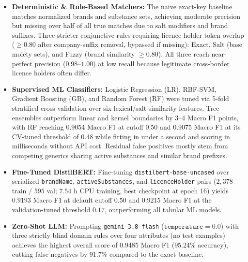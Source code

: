 \documentclass{llncs}
\begin{document}
\begin{itemize}
  \item \textbf{Deterministic \& Rule-Based Matchers:} The naive exact-key baseline matches normalized brands and substance sets, achieving moderate precision but missing over half of all true matches due to salt modifiers and brand suffixes. Three stricter conjunctive rules requiring licence-holder token overlap ($\ge 0.80$ after company-suffix removal, bypassed if missing): Exact, Salt (base moiety sets), and Fuzzy (brand similarity $\ge 0.80$). All three reach near-perfect precision ($0.98$--$1.00$) at low recall because legitimate cross-border licence holders often differ.
  \item \textbf{Supervised ML Classifiers:} Logistic Regression (LR), RBF-SVM, Gradient Boosting (GB), and Random Forest (RF) were tuned via 5-fold stratified cross-validation over six lexical/salt similarity features. Tree ensembles outperform linear and kernel boundaries by 3--4 Macro F1 points, with RF reaching 0.9054 Macro F1 at cutoff 0.50 and 0.9075 Macro F1 at its CV-tuned threshold of 0.48 while fitting in under a second and scoring in milliseconds without API cost. Residual false positives mostly stem from competing generics sharing active substances and similar brand prefixes.
  \item \textbf{Fine-Tuned DistilBERT:} Fine-tuning \texttt{distilbert-base-uncased} over serialized \texttt{brandName}, \texttt{activeSubstances}, and \texttt{licenceHolder} pairs ($2{,}378$ train / $595$ val; $7.54\text{ h}$ CPU training, best checkpoint at epoch 16) yields $0.9193$ Macro F1 at default cutoff $0.50$ and 0.9215 Macro F1 at the validation-tuned threshold $0.17$, outperforming all tabular ML models.
  \item \textbf{Zero-Shot LLM:} Prompting \texttt{gemini-3.8-flash} ($\texttt{temperature}=0.0$) with three strictly blind domain rules over four attributes (no test examples) achieves the highest overall score of 0.9485 Macro F1 ($95.24\%$ accuracy), cutting false negatives by $91.7\%$ compared to the exact baseline.
\end{itemize}
\end{document}

